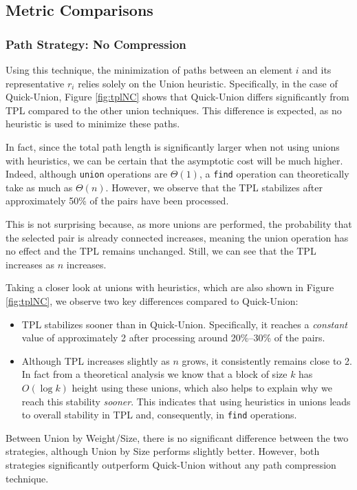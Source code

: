 \subsection{Metric Comparisons}
\subsubsection{Path Strategy: No Compression}
Using this technique, the minimization of paths between an element \( i \) and its representative \( r_i \) relies solely on the Union heuristic. Specifically, in the case of Quick-Union, Figure \ref{fig:tplNC} shows that Quick-Union differs significantly from TPL compared to the other union techniques. This difference is expected, as no heuristic is used to minimize these paths.  

In fact, since the total path length is significantly larger when not using unions with heuristics, we can be certain that the asymptotic cost will be much higher. Indeed, although \texttt{union} operations are \( \Theta(1) \), a \texttt{find} operation can theoretically take as much as \( \Theta(n) \). However, we observe that the TPL stabilizes after approximately 50\% of the pairs have been processed.  

This is not surprising because, as more unions are performed, the probability that the selected pair is already connected increases, meaning the union operation has no effect and the TPL remains unchanged. Still, we can see that the TPL increases as $n$ increases. 

Taking a closer look at unions with heuristics, which are also shown in Figure \ref{fig:tplNC}, we observe two key differences compared to Quick-Union:  
\begin{itemize}  
    \item TPL stabilizes sooner than in Quick-Union. Specifically, it reaches a \textit{constant} value of approximately 2 after processing around 20\%–30\% of the pairs.  
    \item Although TPL increases slightly as \( n \) grows, it consistently remains close to 2. In fact from a theoretical analysis we know that a block of size $k$ has $O(\log k)$ height using these unions, which also helps to explain why we reach this stability \textit{sooner}. This indicates that using heuristics in unions leads to overall stability in TPL and, consequently, in \texttt{find} operations. 
\end{itemize}  

Between Union by Weight/Size, there is no significant difference between the two strategies, although Union by Size performs slightly better. However, both strategies significantly outperform Quick-Union without any path compression technique.

